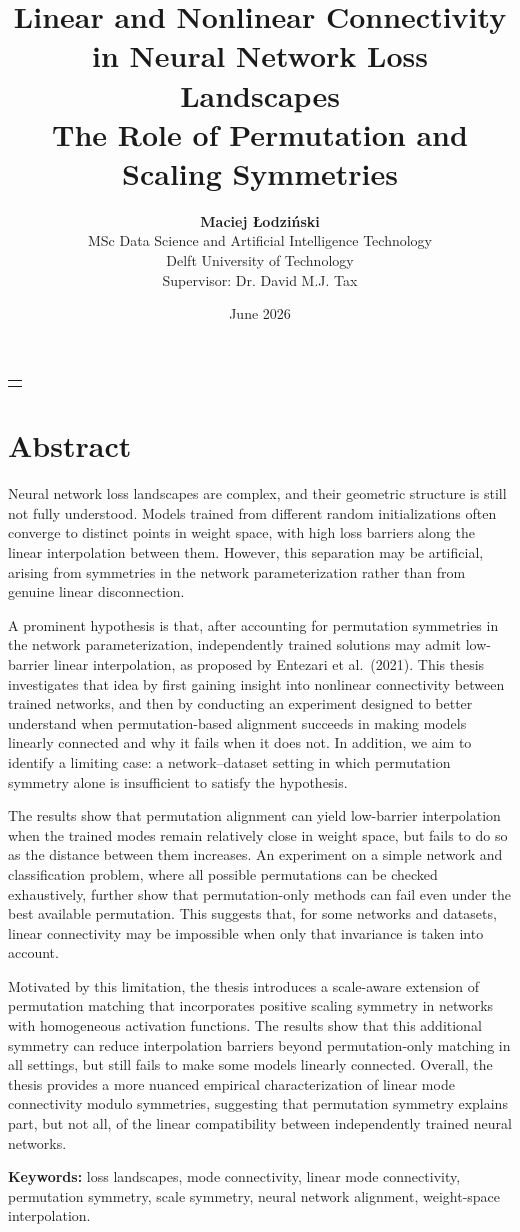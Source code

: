 \documentclass[11pt,a4paper]{report}
\title{\textbf{Linear and Nonlinear Connectivity in Neural Network Loss Landscapes}\\[0.3cm]
\large The Role of Permutation and Scaling Symmetries}
\author{\textbf{Maciej Łodziński}\\[0.2cm]
\small MSc Data Science and Artificial Intelligence Technology\\[0.2cm]
\small Delft University of Technology\\[1.0cm]
\small Supervisor: Dr. David M.J. Tax}
\date{June 2026}
\makeatletter
\renewcommand{\maketitle}{%
\begin{titlepage}
\centering
\vspace*{1.4cm}
{\LARGE \@title \par}
\vspace{1.6cm}
{\large \begin{tabular}[t]{c}\@author\end{tabular}\par}
\vfill
{\large \@date\par}
\end{titlepage}%
}
\makeatother
\begin{document}
\maketitle
{}
\chapter*{Abstract}
{
\setlength{\parindent}{1.5em}
\setlength{\parskip}{0pt}

\indent Neural network loss landscapes are complex, and their geometric structure is still not fully understood. Models trained from different random initializations often converge to distinct points in weight space, with high loss barriers along the linear interpolation between them. However, this separation may be artificial, arising from symmetries in the network parameterization rather than from genuine linear disconnection.
\par\indent A prominent hypothesis is that, after accounting for permutation symmetries in the network parameterization, independently trained solutions may admit low-barrier linear interpolation, as proposed by Entezari et al.~(2021). This thesis investigates that idea by first gaining insight into nonlinear connectivity between trained networks, and then by conducting an experiment designed to better understand when permutation-based alignment succeeds in making models linearly connected and why it fails when it does not. In addition, we aim to identify a limiting case: a network--dataset setting in which permutation symmetry alone is insufficient to satisfy the hypothesis.
\par\indent The results show that permutation alignment can yield low-barrier interpolation when the trained modes remain relatively close in weight space, but fails to do so as the distance between them increases. An experiment on a simple network and classification problem, where all possible permutations can be checked exhaustively, further show that permutation-only methods can fail even under the best available permutation. This suggests that, for some networks and datasets, linear connectivity may be impossible when only that invariance is taken into account.
\par\indent Motivated by this limitation, the thesis introduces a scale-aware extension of permutation matching that incorporates positive scaling symmetry in networks with homogeneous activation functions. The results show that this additional symmetry can reduce interpolation barriers beyond permutation-only matching in all settings, but still fails to make some models linearly connected. Overall, the thesis provides a more nuanced empirical characterization of linear mode connectivity modulo symmetries, suggesting that permutation symmetry explains part, but not all, of the linear compatibility between independently trained neural networks.
\par\vspace{0.8em}\noindent\textbf{Keywords:} loss landscapes, mode connectivity, linear mode connectivity, permutation symmetry, scale symmetry, neural network alignment, weight-space interpolation.
}
\end{document}
